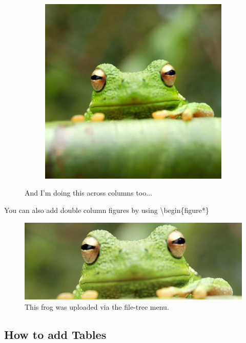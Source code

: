 \documentclass[twocolumn, 9pt]{extarticle}
\begin{document}
\begin{figure}[ht]
\begin{subfigure}[b]{0.1\linewidth}
    \caption{}
    \label{subfig:frog4q}
\end{subfigure}
\begin{subfigure}[b]{0.1\linewidth}
    \includegraphics[width=\linewidth]{frog.jpg}
    \caption{}
    \label{subfig:frog4r}
\end{subfigure}
\caption{And I'm doing this across columns too...}
\label{fig:frog_20_span}
\end{figure}



You can also add double column figures by using \textbackslash begin\{figure*\}


\begin{figure}[ht]
\centering
\includegraphics[width=0.9\linewidth]{frog2.jpg}
\caption{\label{fig:frog2}This frog was uploaded via the file-tree menu.}
\end{figure}

\subsection{How to add Tables}
\end{document}
